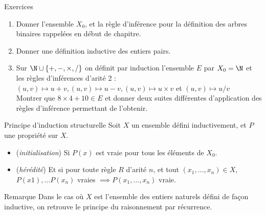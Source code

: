 \documentclass[10pt]{beamer}
\begin{document}
\begin{frame}[fragile]{\Ctitle}{\stitle}
	\begin{exampleblock}{Exercices}
		\begin{enumerate}
			\item<1-> Donner l'ensemble $X_0$, et la règle d'inférence pour la définition des arbres binaires rappelées en début de chapitre.
			\item<2-> Donner une définition inductive des entiers pairs.
			\item<3-> Sur $\N \cup \{+, -, \times, /\}$ on définit par induction l'ensemble $E$ par $X_0 = \N$ et les règles d'inférences d'arité 2 :
				$(u,v) \mapsto u + v, (u,v) \mapsto u - v, (u,v) \mapsto u \times v$ et $(u,v) \mapsto u / v$ \\
				Montrer que $8 \times 4 + 10 \in E$ et donner deux suites différentes d'application des règles d'inférence permettant de l'obtenir.
		\end{enumerate}
	\end{exampleblock}
\end{frame}

\begin{frame}[fragile]{\Ctitle}{\stitle}
	\begin{alertblock}{Principe d'induction structurelle}
		Soit $X$ un ensemble défini inductivement, et $P$ une propriété sur $X$.
		\begin{itemize}
			\item<2-> (\textit{initialisation}) Si $P(x)$ est vraie pour tous les éléments de $X_0$.
			\item<3-> (\textit{hérédité}) Et si pour toute règle $R$ d'arité $n$, et tout $(x_1,\dots,x_n) \in X$, $P(x1), \dots P(x_n)$ vraies $\implies P(x_1,\dots,x_n)$ vraie.
		\end{itemize}
	\end{alertblock}
	{\begin{block}{Remarque}
			Dans le cas où $X$ est l'ensemble des entiers naturels défini de façon inductive, on retrouve le principe du raisonnement par récurrence.
		\end{block}}
\end{frame}
\end{document}
